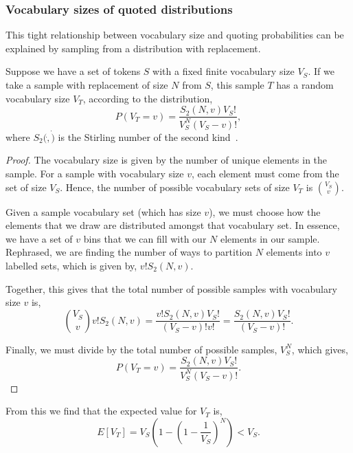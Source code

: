 \subsubsection{Vocabulary sizes of quoted distributions}
This tight relationship between vocabulary size and quoting probabilities can be explained by sampling from a distribution with replacement. 
\begin{theorem}
Suppose we have a set of tokens $S$ with a fixed finite vocabulary size $V_S$. If we take a sample with replacement of size $N$ from $S$, this sample $T$ has a random vocabulary size $V_T$, according to the distribution,
$$P(V_T = v) = \frac{S_{2}(N, v) V_S!}{V_S^{N}(V_S-v)!},$$
where $S_2(\dot, \dot)$ is the Stirling number of the second kind~\cite{graham_concrete_1989}.
\end{theorem}
\begin{proof} %
The vocabulary size is given by the number of unique elements in the sample. For a sample with vocabulary size $v$, each element must come from the set of size $V_S$. Hence, the number of possible vocabulary sets of size $V_T$ is $\binom{V_S}{v}$.


Given a sample vocabulary set (which has size $v$), we must choose how the elements that we draw are distributed amongst that vocabulary set. In essence, we have a set of $v$ bins that we can fill with our $N$ elements in our sample. Rephrased, we are finding the number of ways to partition $N$ elements into $v$ labelled sets, which is given by, $v! S_2(N, v).$


Together, this gives that the total number of possible samples with vocabulary size $v$ is,
$$ \binom{V_S}{v} v! S_2(N, v) =  \frac{ v! S_2(N, v) V_S! }{(V_S - v)! v!} = \frac{S_2(N, v) V_S! }{(V_S - v)!}.$$

Finally, we must divide by the total number of possible samples, $V_S^N$, which gives,
$$P(V_T = v) = \frac{S_{2}(N, v) V_S!}{V_S^{N}(V_S-v)!}.$$
\end{proof}


From this we find that the expected value for $V_T$ is,
$$E\left[V_T \right] = V_S\left(1-\left(1-\frac{1}{V_S}\right)^{N}\right) < V_S.$$ 

